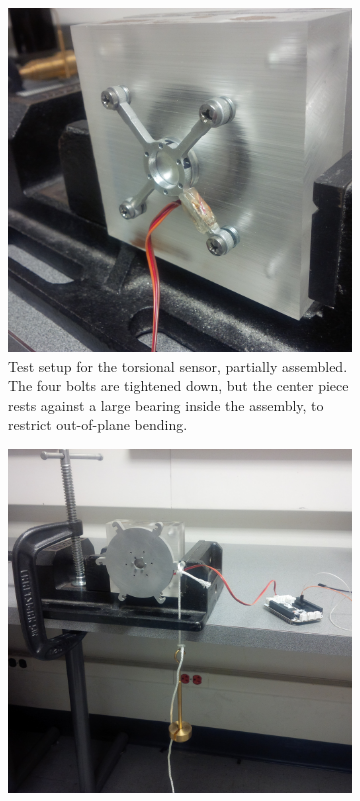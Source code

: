 \documentclass[12pt]{report}
\begin{document}
\begin{figure}[hbt]
  \begin{center}
    \begin{subfigure}[b]{0.45\textwidth}
      \includegraphics[width=1\textwidth]{./img/test_setup_exposed.jpg}
      \caption{Test setup for the torsional sensor, partially assembled. The four bolts are tightened down, but the center piece rests against a large bearing inside the assembly, to restrict out-of-plane bending.}
      \label{fig:sensor_test_setup_exposed}
    \end{subfigure}
    \begin{subfigure}[b]{0.45\textwidth}
      \includegraphics[width=1\textwidth]{./img/test_setup_complete.jpg}

\end{subfigure}
\end{center}
\end{figure}
\end{document}
